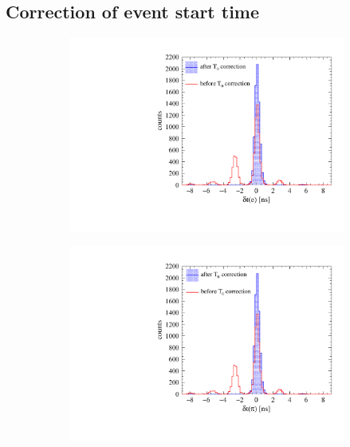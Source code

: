 \subsection{Correction of event start time}\label{sec:t0_corr}
%
%
\begin{figure}[b]
  \centering
  \begin{subfigure}{0.45\textwidth}
  {\includegraphics[width=1.0\textwidth]{Chapter7_analysis_kloe/img/tof_e_t0}}
\end{subfigure}
%
\begin{subfigure}{0.45\textwidth}
  {\includegraphics[width=1.0\textwidth]{Chapter7_analysis_kloe/img/tof_pi_t0}}
\end{subfigure}
%
\begin{subfigure}{0.45\textwidth}

\end{subfigure}
\end{figure}

